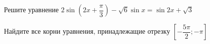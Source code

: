 \begin{ex}
	\begin{condition}
		\begin{enumcols}[label=\asbuk*)]
			\item Решите уравнение \( 2\sin{\left( 2x + \dfrac{\pi}{3}\right)} - \sqrt{6}\sin x =\sin 2x + \sqrt{3} \)
			\item Найдите все корни уравнения, принадлежащие отрезку \(  \left[-\dfrac{5\pi}{2};-\pi\right] \)
		\end{enumcols}
	\end{condition}
\end{ex}
